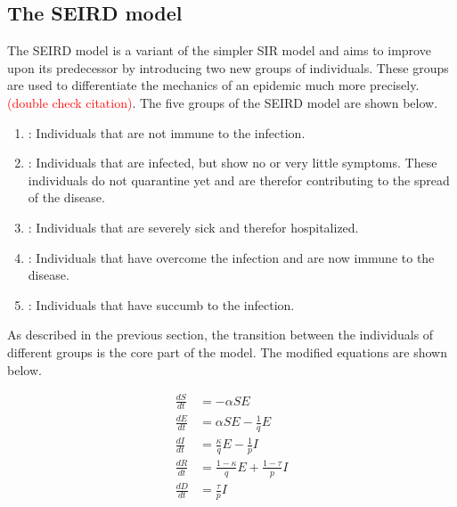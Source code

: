 \subsection{The SEIRD model}
\label{sec:SEIRD}
The SEIRD model is a variant of the simpler SIR model\cite{knodel20173d} and aims to improve upon its predecessor by
introducing two new groups of individuals. These groups are used to differentiate the mechanics of an epidemic much
more precisely.
\textcolor{red}{(double check citation)}. %
The five groups of the SEIRD model are shown below.

\begin{enumerate}[label=$\bullet$]
	\item {}: Individuals that are not immune to the infection.
	\item {}: Individuals that are infected, but show no or very little symptoms. These individuals
		do not quarantine yet and are therefor contributing to the spread of the disease.
	\item {}: Individuals that are severely sick and therefor hospitalized.
	\item {}: Individuals that  have overcome the infection and are now immune to the disease.
	\item {}: Individuals that have succumb to the infection.
\end{enumerate}


As described in the previous section, the transition between the individuals of different groups is the core
part of the model. The modified equations are shown below.

\begin{align}
	\frac{dS}{dt} &= -\alpha S E \label{eq:SEIRD1_S} \\
	\frac{dE}{dt} &= \alpha S E -\frac{1}{q} E \label{eq:SEIRD1_E} \\
	\frac{dI}{dt} &= \frac{\kappa}{q} E - \frac{1}{p} I \label{eq:SEIRD1_I} \\
	\frac{dR}{dt} &= \frac{1-\kappa}{q} E + \frac{1-\tau}{p} I \label{eq:SEIRD1_R} \\
	\frac{dD}{dt} &= \frac{\tau}{p} I \label{eq:SEIRD1_D} 
\end{align}

